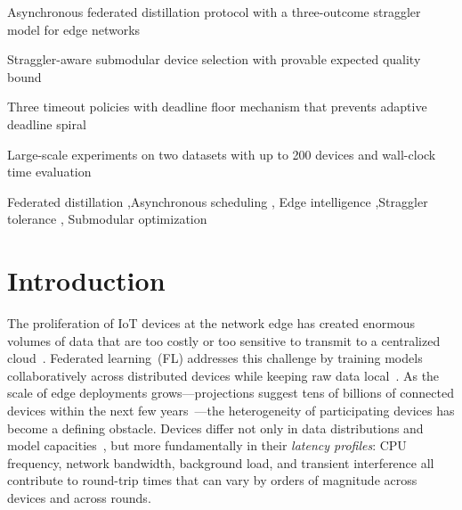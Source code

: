 \documentclass[a4paper,fleqn]{cas-dc}
\begin{document}
	\begin{highlights}
		\item Asynchronous federated distillation protocol with a
		three-outcome straggler model for edge networks
		\item Straggler-aware submodular device selection with provable
		expected quality bound
		\item Three timeout policies with deadline floor mechanism that
		prevents adaptive deadline spiral
		\item Large-scale experiments on two datasets with up to 200 devices
		and wall-clock time evaluation
	\end{highlights}
	
	\begin{keywords}
		Federated distillation \sep Asynchronous scheduling \sep
		Edge intelligence \sep Straggler tolerance \sep
		Submodular optimization
	\end{keywords}
	
	\maketitle
	
	\section{Introduction}\label{sec:intro}
	
	The proliferation of IoT devices at the network edge has created
	enormous volumes of data that are too costly or too sensitive to
	transmit to a centralized cloud~\citep{shi_edge_computing}.
	Federated learning~(FL) addresses this challenge by training models
	collaboratively across distributed devices while keeping raw data
	local~\citep{mcmahan_fedavg_2017, kairouz_fl_advances_2021}.  As
	the scale of edge deployments grows---projections suggest tens of
	billions of connected devices within the next few
	years~\citep{lim_fl_mobile_edge_2020}---the heterogeneity of
	participating devices has become a defining obstacle.  Devices differ
	not only in data distributions and model
	capacities~\citep{qin_kdfl_survey_2025}, but more fundamentally in
	their \emph{latency profiles}: CPU frequency, network bandwidth,
	background load, and transient interference all contribute to
	round-trip times that can vary by orders of magnitude across devices
	and across rounds.
	
\end{document}

